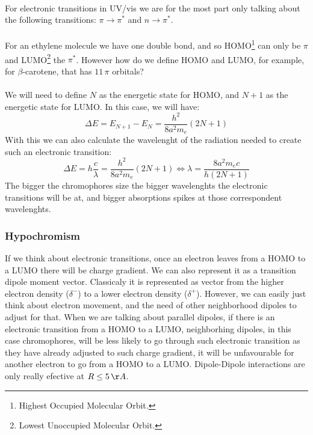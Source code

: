 \documentclass[12pt,  letterpaper]{article}
\begin{document}
\paragraph*{}
For electronic transitions in UV/vis we are for the most part only talking about the following transitions: $\pi \rightarrow \pi^{*}$ and $n \rightarrow \pi^{*}$.
\paragraph*{}
For an ethylene molecule we have one double bond, and so HOMO\footnote{Highest Occupied Molecular Orbit.} can only be $\pi$ and LUMO\footnote{Lowest Unoccupied Molecular Orbit.} the $\pi^{*}$. However how do we define HOMO and LUMO, for example, for $\beta$-carotene, that has $11\,\pi$ orbitals?
\paragraph*{}
We will need to define $N$ as the energetic state for HOMO, and $N+1$ as the energetic state for LUMO. In this case, we will have:
\begin{equation}
\Delta E = E_{N+1} - E_{N} = \frac{h^{2}}{8a^{2}m_{e}}(2N+1)
\end{equation}
With this we can also calculate the wavelenght of the radiation needed to create such an electronic transition:
\begin{equation}
\Delta E = h\frac{c}{\lambda} = \frac{h^{2}}{8a^{2}m_{e}}(2N+1) \Leftrightarrow \lambda = \frac{8a^{2}m_{e}c}{h(2N+1)}
\end{equation}
The bigger the chromophores size the bigger wavelenghts the electronic transitions will be at, and bigger absorptions spikes at those correspondent wavelenghts.	
\paragraph*{}
\subsubsection*{Hypochromism}
If we think about electronic transitions, once an electron leaves from a HOMO to a LUMO there will be charge gradient. We can also represent it as a transition dipole moment vector. Classicaly it is represented as vector from the higher electron density ($\delta^{-}$) to a lower electron density ($\delta^{+}$). However, we can easily just think about electron movement, and the need of other neighborhood dipoles to adjust for that. When we are talking about parallel dipoles, if there is an electronic transition from a HOMO to a LUMO, neighborhing dipoles, in this case chromophores, will be less likely to go through such electronic transition as they have already adjusted to such charge gradient, it will be unfavourable for another electron to go from a HOMO to a LUMO. Dipole-Dipole interactions are only really efective at $R \leq 5\,\AA$.
\end{document}
